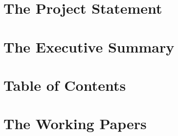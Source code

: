 \documentclass[12pt,a4paper,numbers=noenddot]{scrartcl}
\begin{document}

\setcounter{page}{1}

\section{The Project Statement}
\section{The Executive Summary}
\newpage
\section{Table of Contents}
\tableofcontents
\newpage
\section{The Working Papers}
\end{document}
